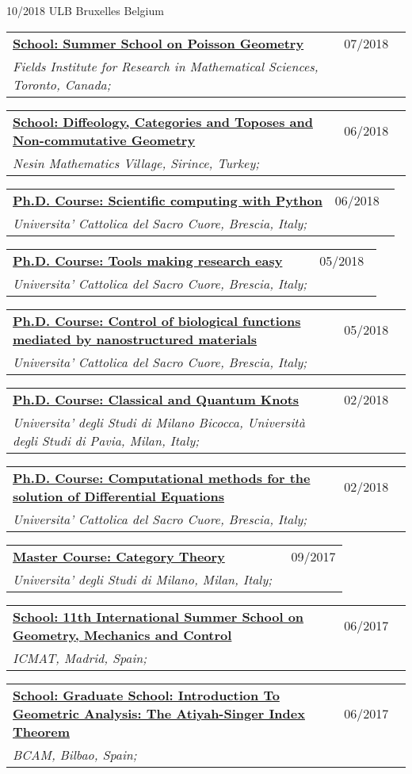 \documentclass[a4paper]{article}
\newcommand{\longvoice}[8]{
	\begin{tabular}{p{0.83\linewidth} p{0.17\linewidth} }
		\textbf{\href{#3}{#2: #1}} & #4 
		\\ 
		\textit{#5, #6, #7;} & {\small\emph{#8}}
	\end{tabular}
	\vspace{.5em}
}
\begin{document}
		{10/2018}
		{ULB}
		{Bruxelles}
		{Belgium}
		{}
	\longvoice{Summer School on Poisson Geometry}
		{School}
		{https://web.archive.org/web/20190831105310/http://www.fields.utoronto.ca/activities/18-19/poisson-summer-school}
		{07/2018}
		{Fields Institute for Research in Mathematical Sciences}
		{Toronto}
		{Canada}
		{}
	\longvoice{Diffeology, Categories and Toposes and Non-commutative Geometry}
		{School}
		{https://web.archive.org/web/20171123204026/http://www.nesinkoyleri.org/eng/events-detail.php?egitimkod=203\#icerikler}
		{06/2018}
		{Nesin Mathematics Village}
		{Sirince}
		{Turkey}
		{}
	\longvoice{Scientific computing with Python}
		{Ph.D. Course}
		{https://web.archive.org/web/20180604081514/http://dmf.unicatt.it/~della/pythoncourse18/}
		{06/2018}
		{Universita' Cattolica del Sacro Cuore}
		{Brescia}
		{Italy}
		{}
	\longvoice{Tools making research easy}
		{Ph.D. Course}
		{https://web.archive.org/web/20180604080852/http://www.dmf.unicatt.it/kropf/scientifictools18.html}
		{05/2018}
		{Universita' Cattolica del Sacro Cuore}
		{Brescia}
		{Italy}
		{}
	\longvoice{Control of biological functions mediated by nanostructured materials}
		{Ph.D. Course}
		{https://www.dropbox.com/s/8udz4zmfaxr9xb8/1805-Course-Ciofani.pdf?dl=0}
		{05/2018}
		{Universita' Cattolica del Sacro Cuore}
		{Brescia}
		{Italy}
		{}
	\longvoice{Classical and Quantum Knots}
		{Ph.D. Course}
		{https://www.dropbox.com/s/stqvkes58o410zk/1802-Course-RiccaKnots.pdf?dl=0}
		{02/2018}
		{Universita' degli Studi di Milano Bicocca, Università degli Studi di Pavia}
		{Milan}
		{Italy}
		{}
	\longvoice{Computational methods for the solution of Differential Equations}
		{Ph.D. Course}
		{https://www.dropbox.com/s/q2rapau2k49n5t7/1802-Course-NumericalPdeAvella.pdf?dl=0}
		{02/2018}
		{Universita' Cattolica del Sacro Cuore}
		{Brescia}
		{Italy}
		{}
	\longvoice{Category Theory}
		{Master Course}
		{https://web.archive.org/web/20190831103757/http://www.mat.unimi.it/users/mantovani/}
		{09/2017}
		{Universita' degli Studi di Milano}
		{Milan}
		{Italy}
		{}
	\longvoice{11th International Summer School on Geometry, Mechanics and Control}
		{School}
		{https://web.archive.org/web/20170623165825/http://gmcnet.webs.ull.es/?q=activity-detaill/1812}
		{06/2017}
		{ICMAT}
		{Madrid}
		{Spain}
		{}
	\longvoice{Graduate School: Introduction To Geometric Analysis: The Atiyah-Singer Index Theorem}
		{School}
		{https://web.archive.org/web/20170623165642/http://www.bcamath.org/es/workshops/bcam-upv-ehu-graduate-school-geometry}
		{06/2017}
		{BCAM}
		{Bilbao}
		{Spain}
		{}
\end{document}
